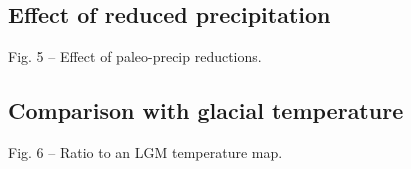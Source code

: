 \documentclass[manuscript]{copernicus}
\begin{document}
\subsection{Effect of reduced precipitation}

    Fig. 5 -- Effect of paleo-precip reductions.

\subsection{Comparison with glacial temperature}

    Fig. 6 -- Ratio to an LGM temperature map.




\conclusions








% 
% 


\end{document}
